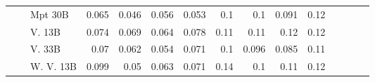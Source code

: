 \begin{table}[!htbp]
\begin{tabular}{l|l|l|rrrr|rrrr|rrrr}
 &  & Mpt 30B    & {\cellcolor[HTML]{AACFE5}} \color[HTML]{000000} 0.065 & {\cellcolor[HTML]{CDE0F1}} \color[HTML]{000000} 0.046 & {\cellcolor[HTML]{BED8EC}} \color[HTML]{000000} 0.056 & {\cellcolor[HTML]{C3DAEE}} \color[HTML]{000000} 0.053    & {\cellcolor[HTML]{FCB69B}} \color[HTML]{000000} 0.1 & {\cellcolor[HTML]{FCB69B}} \color[HTML]{000000} 0.1 & {\cellcolor[HTML]{FCC1A8}} \color[HTML]{000000} 0.091 & {\cellcolor[HTML]{FCA082}} \color[HTML]{000000} 0.12 \\
 &  & V. 13B  & {\cellcolor[HTML]{94C4DF}} \color[HTML]{000000} 0.074 & {\cellcolor[HTML]{A3CCE3}} \color[HTML]{000000} 0.069 & {\cellcolor[HTML]{ABD0E6}} \color[HTML]{000000} 0.064 & {\cellcolor[HTML]{8ABFDD}} \color[HTML]{000000} 0.078    & {\cellcolor[HTML]{FCA486}} \color[HTML]{000000} 0.11 & {\cellcolor[HTML]{FCA689}} \color[HTML]{000000} 0.11 & {\cellcolor[HTML]{FC997A}} \color[HTML]{000000} 0.12 & {\cellcolor[HTML]{FCA183}} \color[HTML]{000000} 0.12 \\
 &  & V. 33B    & {\cellcolor[HTML]{9FCAE1}} \color[HTML]{000000} 0.07 & {\cellcolor[HTML]{B0D2E7}} \color[HTML]{000000} 0.062 & {\cellcolor[HTML]{C2D9EE}} \color[HTML]{000000} 0.054 & {\cellcolor[HTML]{9CC9E1}} \color[HTML]{000000} 0.071    & {\cellcolor[HTML]{FCB69B}} \color[HTML]{000000} 0.1 & {\cellcolor[HTML]{FCBBA1}} \color[HTML]{000000} 0.096 & {\cellcolor[HTML]{FDC6B0}} \color[HTML]{000000} 0.085 & {\cellcolor[HTML]{FCA98C}} \color[HTML]{000000} 0.11 \\
 &  & W. V. 13B  & {\cellcolor[HTML]{56A0CE}} \color[HTML]{F1F1F1} 0.099 & {\cellcolor[HTML]{C8DCF0}} \color[HTML]{000000} 0.05 & {\cellcolor[HTML]{AED1E7}} \color[HTML]{000000} 0.063 & {\cellcolor[HTML]{9CC9E1}} \color[HTML]{000000} 0.071    & {\cellcolor[HTML]{FC8565}} \color[HTML]{F1F1F1} 0.14 & {\cellcolor[HTML]{FCB499}} \color[HTML]{000000} 0.1 & {\cellcolor[HTML]{FCA98C}} \color[HTML]{000000} 0.11 & {\cellcolor[HTML]{FC9879}} \color[HTML]{000000} 0.12 \\


\end{tabular}
\end{table}
